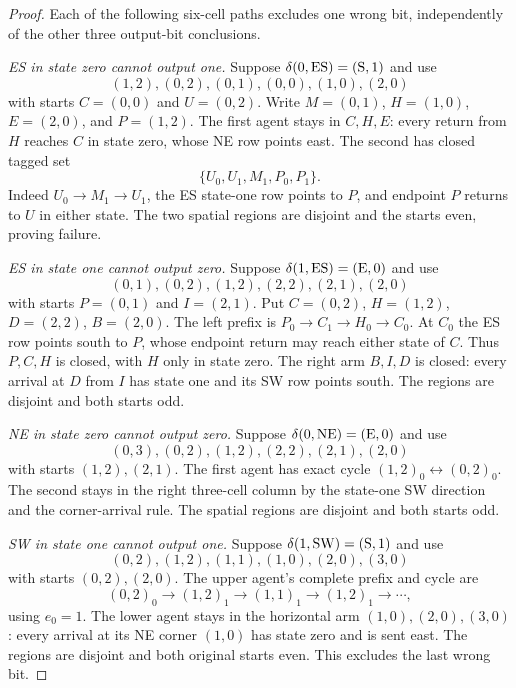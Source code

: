 \begin{proof}
Each of the following six-cell paths excludes one wrong bit,
independently of the other three output-bit conclusions.

\emph{ES in state zero cannot output one.}
Suppose $\delta(0,\mathrm{ES})=(\mathrm{S},1)$ and use
\[
(1,2),(0,2),(0,1),(0,0),(1,0),(2,0)
\]
with starts $C=(0,0)$ and $U=(0,2)$.
Write $M=(0,1)$, $H=(1,0)$, $E=(2,0)$, and $P=(1,2)$.
The first agent stays in $C,H,E$: every return from $H$ reaches
$C$ in state zero, whose NE row points east.
The second has closed tagged set
\[
\{U_0,U_1,M_1,P_0,P_1\}.
\]
Indeed $U_0\to M_1\to U_1$, the ES state-one row points to $P$,
and endpoint $P$ returns to $U$ in either state. The two spatial
regions are disjoint and the starts even, proving failure.

\emph{ES in state one cannot output zero.}
Suppose $\delta(1,\mathrm{ES})=(\mathrm{E},0)$ and use
\[
(0,1),(0,2),(1,2),(2,2),(2,1),(2,0)
\]
with starts $P=(0,1)$ and $I=(2,1)$.
Put $C=(0,2)$, $H=(1,2)$, $D=(2,2)$, $B=(2,0)$.
The left prefix is
$P_0\to C_1\to H_0\to C_0$.
At $C_0$ the ES row points south to $P$, whose endpoint return
may reach either state of $C$. Thus $P,C,H$ is closed, with $H$
only in state zero. The right arm $B,I,D$ is closed: every
arrival at $D$ from $I$ has state one and its SW row points south.
The regions are disjoint and both starts odd.

\emph{NE in state zero cannot output zero.}
Suppose $\delta(0,\mathrm{NE})=(\mathrm{E},0)$ and use
\[
(0,3),(0,2),(1,2),(2,2),(2,1),(2,0)
\]
with starts $(1,2),(2,1)$.
The first agent has exact cycle $(1,2)_0\leftrightarrow(0,2)_0$.
The second stays in the right three-cell column by the
state-one SW direction and the corner-arrival rule.
The spatial regions are disjoint and both starts odd.

\emph{SW in state one cannot output one.}
Suppose $\delta(1,\mathrm{SW})=(\mathrm{S},1)$ and use
\[
(0,2),(1,2),(1,1),(1,0),(2,0),(3,0)
\]
with starts $(0,2),(2,0)$.
The upper agent's complete prefix and cycle are
\[
(0,2)_0\to(1,2)_1\to(1,1)_1\to(1,2)_1\to\cdots,
\]
using $e_0=1$. The lower agent stays in the horizontal arm
$(1,0),(2,0),(3,0)$: every arrival at its NE corner $(1,0)$
has state zero and is sent east. The regions are disjoint and
both original starts even. This excludes the last wrong bit.
\end{proof}
